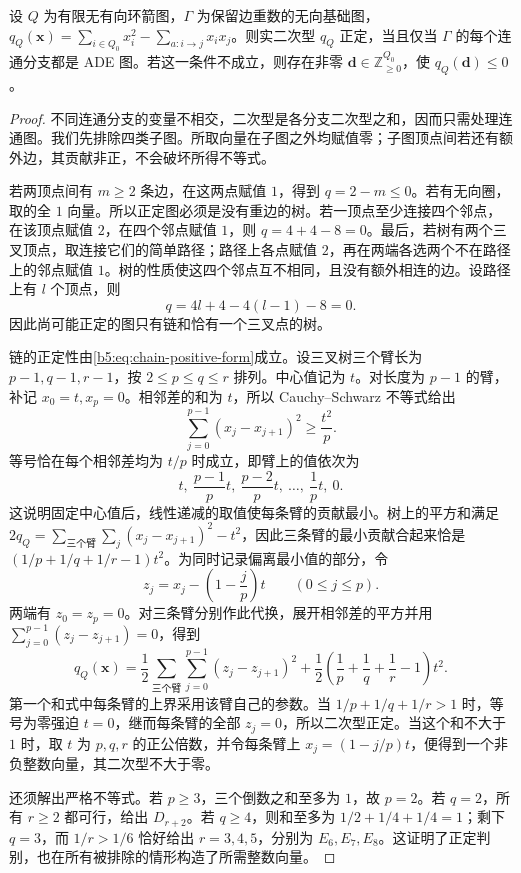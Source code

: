 \begin{theorem}[正定型的图判别]\label{b5:thm:ade-positive-form}
	设 \(Q\) 为有限无有向环箭图，\(\Gamma\) 为保留边重数的无向基础图，\(q_Q(\mathbf x)=\sum_{i\in Q_0}x_i^2-\sum_{a:i\to j}x_ix_j\)。则实二次型 \(q_Q\) 正定，当且仅当 \(\Gamma\) 的每个连通分支都是 ADE 图。若这一条件不成立，则存在非零 \(\mathbf d\in\mathbb Z_{\geq0}^{Q_0}\)，使 \(q_Q(\mathbf d)\leq0\)。
\end{theorem}
\begin{proof}
	不同连通分支的变量不相交，二次型是各分支二次型之和，因而只需处理连通图。我们先排除四类子图。所取向量在子图之外均赋值零；子图顶点间若还有额外边，其贡献非正，不会破坏所得不等式。

	若两顶点间有 \(m\geq2\) 条边，在这两点赋值 \(1\)，得到 \(q=2-m\leq0\)。若有无向圈，取的全 \(1\) 向量。所以正定图必须是没有重边的树。若一顶点至少连接四个邻点，在该顶点赋值 \(2\)，在四个邻点赋值 \(1\)，则 \(q=4+4-8=0\)。最后，若树有两个三叉顶点，取连接它们的简单路径；路径上各点赋值 \(2\)，再在两端各选两个不在路径上的邻点赋值 \(1\)。树的性质使这四个邻点互不相同，且没有额外相连的边。设路径上有 \(l\) 个顶点，则
	\[
		q=4l+4-4(l-1)-8=0.
	\]
	因此尚可能正定的图只有链和恰有一个三叉点的树。

	链的正定性由\eqref{b5:eq:chain-positive-form}成立。设三叉树三个臂长为 \(p-1,q-1,r-1\)，按 \(2\leq p\leq q\leq r\) 排列。中心值记为 \(t\)。对长度为 \(p-1\) 的臂，补记 \(x_0=t,x_p=0\)。相邻差的和为 \(t\)，所以 Cauchy--Schwarz 不等式给出
	\[
		\sum_{j=0}^{p-1}(x_j-x_{j+1})^2\geq\frac{t^2}{p}.
	\]
	等号恰在每个相邻差均为 \(t/p\) 时成立，即臂上的值依次为
	\[
		t,\ \frac{p-1}{p}t,\ \frac{p-2}{p}t,\ \ldots,\ \frac1p t,\ 0.
	\]
	这说明固定中心值后，线性递减的取值使每条臂的贡献最小。树上的平方和满足 \(2q_Q=\sum_{\text{三个臂}}\sum_j(x_j-x_{j+1})^2-t^2\)，因此三条臂的最小贡献合起来恰是 \((1/p+1/q+1/r-1)t^2\)。为同时记录偏离最小值的部分，令
	\[
		z_j=x_j-\left(1-\frac jp\right)t\qquad(0\leq j\leq p).
	\]
	两端有 \(z_0=z_p=0\)。对三条臂分别作此代换，展开相邻差的平方并用 \(\sum_{j=0}^{p-1}(z_j-z_{j+1})=0\)，得到
	\begin{equation}\label{b5:eq:three-arm-square-completion}
		q_Q(\mathbf x)=\frac12\sum_{\text{三个臂}}\sum_{j=0}^{p-1} (z_j-z_{j+1})^2 +\frac12\left(\frac1p+\frac1q+\frac1r-1\right)t^2.
	\end{equation}
	第一个和式中每条臂的上界采用该臂自己的参数。当 \(1/p+1/q+1/r>1\) 时，等号为零强迫 \(t=0\)，继而每条臂的全部 \(z_j=0\)，所以二次型正定。当这个和不大于 \(1\) 时，取 \(t\) 为 \(p,q,r\) 的正公倍数，并令每条臂上 \(x_j=(1-j/p)t\)，便得到一个非负整数向量，其二次型不大于零。

	还须解出严格不等式。若 \(p\geq3\)，三个倒数之和至多为 \(1\)，故 \(p=2\)。若 \(q=2\)，所有 \(r\geq2\) 都可行，给出 \(D_{r+2}\)。若 \(q\geq4\)，则和至多为 \(1/2+1/4+1/4=1\)；剩下 \(q=3\)，而 \(1/r>1/6\) 恰好给出 \(r=3,4,5\)，分别为 \(E_6,E_7,E_8\)。这证明了正定判别，也在所有被排除的情形构造了所需整数向量。
\end{proof}

